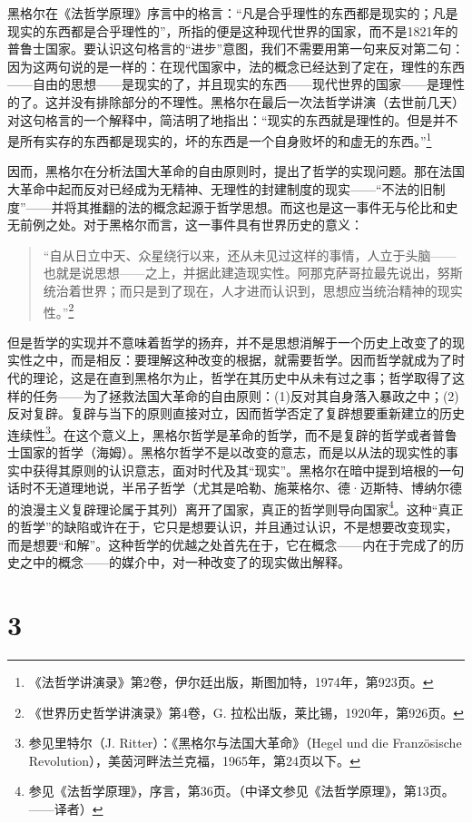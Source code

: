 黑格尔在《法哲学原理》序言中的格言：“凡是合乎理性的东西都是现实的；凡是现实的东西都是合乎理性的”，所指的便是这种现代世界的国家，而不是1821年的普鲁士国家。要认识这句格言的“进步”意图，我们不需要用第一句来反对第二句：因为这两句说的是一样的：在现代国家中，法的概念已经达到了定在，理性的东西——自由的思想——是现实的了，并且现实的东西——现代世界的国家——是理性的了。这并没有排除部分的不理性。黑格尔在最后一次法哲学讲演（去世前几天）对这句格言的一个解释中，简洁明了地指出：“现实的东西就是理性的。但是并不是所有实存的东西都是现实的，坏的东西是一个自身败坏的和虚无的东西。”\footnote{《法哲学讲演录》第2卷，伊尔廷出版，斯图加特，1974年，第923页。}

因而，黑格尔在分析法国大革命的自由原则时，提出了哲学的实现问题。那在法国大革命中起而反对已经成为无精神、无理性的封建制度的现实——“不法的旧制度”——并将其推翻的法的概念起源于哲学思想。而这也是这一事件无与伦比和史无前例之处。对于黑格尔而言，这一事件具有世界历史的意义：

\begin{quote}
“自从日立中天、众星绕行以来，还从未见过这样的事情，人立于头脑——也就是说思想——之上，并据此建造现实性。阿那克萨哥拉最先说出，努斯统治着世界；而只是到了现在，人才进而认识到，思想应当统治精神的现实性。”\footnote{《世界历史哲学讲演录》第4卷，G. 拉松出版，莱比锡，1920年，第926页。}
\end{quote}

但是哲学的实现并不意味着哲学的扬弃，并不是思想消解于一个历史上改变了的现实性之中，而是相反：要理解这种改变的根据，就需要哲学。因而哲学就成为了时代的理论，这是在直到黑格尔为止，哲学在其历史中从未有过之事；哲学取得了这样的任务——为了拯救法国大革命的自由原则：(1)反对其自身落入暴政之中；(2)反对复辟。复辟与当下的原则直接对立，因而哲学否定了复辟想要重新建立的历史连续性\footnote{参见里特尔（J. Ritter）：《黑格尔与法国大革命》（Hegel und die Französische Revolution），美茵河畔法兰克福，1965年，第24页以下。}。在这个意义上，黑格尔哲学是革命的哲学，而不是复辟的哲学或者普鲁士国家的哲学（海姆）。黑格尔哲学不是以改变的意志，而是以从法的现实性的事实中获得其原则的认识意志，面对时代及其“现实”。黑格尔在暗中提到培根的一句话时不无道理地说，半吊子哲学（尤其是哈勒、施莱格尔、德·迈斯特、博纳尔德的浪漫主义复辟理论属于其列）离开了国家，真正的哲学则导向国家\footnote{参见《法哲学原理》，序言，第36页。（中译文参见《法哲学原理》，第13页。——译者）}。这种“真正的哲学”的缺陷或许在于，它只是想要认识，并且通过认识，不是想要改变现实，而是想要“和解”。这种哲学的优越之处首先在于，它在概念——内在于完成了的历史之中的概念——的媒介中，对一种改变了的现实做出解释。

\section*{3}

